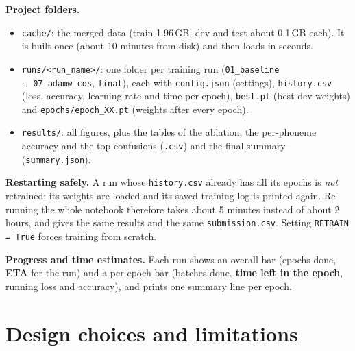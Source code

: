 \documentclass[11pt,a4paper]{article}
\begin{document}
\textbf{Project folders.}
\begin{itemize}\itemsep1pt
  \item \texttt{cache/}: the merged data (train 1.96\,GB, dev and test about 0.1\,GB each). It is built
        once (about 10 minutes from disk) and then loads in seconds.
  \item \texttt{runs/<run\_name>/}: one folder per training run (\texttt{01\_baseline} \dots\
        \texttt{07\_adamw\_cos}, \texttt{final}), each with \texttt{config.json} (settings),
        \texttt{history.csv} (loss, accuracy, learning rate and time per epoch), \texttt{best.pt} (best dev
        weights) and \texttt{epochs/epoch\_XX.pt} (weights after every epoch).
  \item \texttt{results/}: all figures, plus the tables of the ablation, the per-phoneme accuracy and the
        top confusions (\texttt{.csv}) and the final summary (\texttt{summary.json}).
\end{itemize}

\textbf{Restarting safely.} A run whose \texttt{history.csv} already has all its epochs is \emph{not}
retrained: its weights are loaded and its saved training log is printed again. Re-running the whole
notebook therefore takes about 5 minutes instead of about 2 hours, and gives the same results and the
same \texttt{submission.csv}. Setting \texttt{RETRAIN = True} forces training from scratch.

\textbf{Progress and time estimates.} Each run shows an overall bar (epochs done, \textbf{ETA} for the
run) and a per-epoch bar (batches done, \textbf{time left in the epoch}, running loss and accuracy), and
prints one summary line per epoch.

\section{Design choices and limitations}
\end{document}
